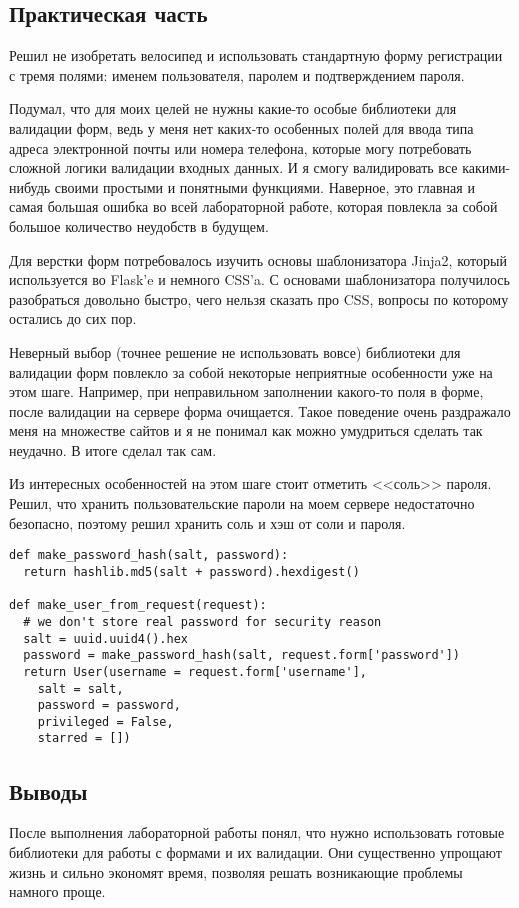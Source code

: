 \documentclass[14pt, a4paper]{extreport}
\begin{document}
\subsection*{Практическая часть}
Решил не изобретать велосипед и использовать стандартную форму регистрации
с тремя полями: именем пользователя, паролем и подтверждением пароля.

Подумал, что для моих целей не нужны какие-то особые библиотеки для валидации форм,
ведь у меня нет каких-то особенных полей для ввода типа адреса электронной почты или
номера телефона, которые могу потребовать сложной логики валидации входных данных.
И я смогу валидировать все какими-нибудь своими простыми и понятными функциями.
Наверное, это главная и самая большая ошибка во всей лабораторной работе, которая
повлекла за собой большое количество неудобств в будущем.

Для верстки форм потребовалось изучить основы шаблонизатора Jinja2, который используется
во Flask'e и немного CSS'a. С основами шаблонизатора получилось разобраться довольно
быстро, чего нельзя сказать про CSS, вопросы по которому остались до сих пор.

Неверный выбор (точнее решение не использовать вовсе) библиотеки для валидации форм
повлекло за собой некоторые неприятные особенности уже на этом шаге.
Например, при неправильном заполнении какого-то поля в форме, после валидации на сервере
форма очищается. Такое поведение очень раздражало меня на множестве сайтов и я не понимал
как можно умудриться сделать так неудачно. В итоге сделал так сам.

Из интересных особенностей на этом шаге стоит отметить <<соль>> пароля.
Решил, что хранить пользовательские пароли на моем сервере недостаточно безопасно,
поэтому решил хранить соль и хэш от соли и пароля.

\begin{lstlisting}
def make_password_hash(salt, password):
  return hashlib.md5(salt + password).hexdigest()

def make_user_from_request(request):
  # we don't store real password for security reason
  salt = uuid.uuid4().hex
  password = make_password_hash(salt, request.form['password'])
  return User(username = request.form['username'],
    salt = salt,
    password = password,
    privileged = False,
    starred = [])
\end{lstlisting}

\subsection*{Выводы}
После выполнения лабораторной работы понял, что нужно использовать
готовые библиотеки для работы с формами и их валидации. Они существенно
упрощают жизнь и сильно экономят время, позволяя решать возникающие проблемы
намного проще.
\end{document}
